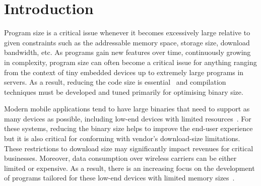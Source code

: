 
\chapter{Introduction}

Program size is a critical issue whenever it becomes excessively large relative to given constraints such as the addressable memory space, storage size, download bandwidth, etc.
As programs gain new features over time, continuously growing in complexity, program size can often become a critical issue for anything ranging from the context of tiny embedded devices up to extremely large programs in servers.
As a result, reducing the code size is essential~\cite{schultz03,varma04,sehgal12,keoh14,auler17} and compilation techniques must be developed and tuned primarily for optimising binary size.



Modern mobile applications tend to have large binaries that need to support as many devices as possible, including low-end devices with limited resources~\cite{hart02,etzo10}.
For these systems, reducing the binary size helps to improve the end-user experience but it is also critical for conforming with vendor's download-size limitations.
These restrictions to download size may significantly impact revenues for critical businesses.
Moreover, data consumption over wireless carriers can be either limited or expensive.
As a result, there is an increasing focus on the development of programs tailored for these low-end devices with limited memory sizes~\cite{androidGo,hahm16}.

